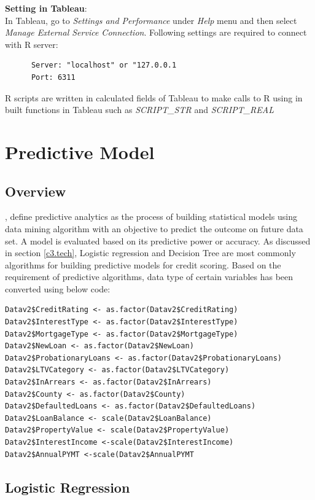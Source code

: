 \textbf{Setting in Tableau}:\\

In Tableau, go to \emph{Settings and Performance} under \emph{Help} menu and then select \emph{Manage External Service Connection}. Following settings are required to connect with R server:
      \begin{verbatim}
      Server: "localhost" or "127.0.0.1
      Port: 6311
      \end{verbatim}

R scripts are written in calculated fields of Tableau to make calls to R using in built functions in Tableau such as \emph{SCRIPT\_STR} and \emph{SCRIPT\_REAL}



\section{Predictive Model}

\subsection{Overview}
\cite{shmueli2011predictive}, define predictive analytics as the process of building statistical models using data mining algorithm with an objective to predict the outcome on future data set. A model is evaluated based on its predictive power or accuracy. As discussed in section \ref{c3.tech}, Logistic regression and Decision Tree are most commonly algorithms for building predictive models for credit scoring. Based on the requirement of predictive algorithms, data type of certain variables has been converted using below code:

\begin{verbatim}
Datav2$CreditRating <- as.factor(Datav2$CreditRating)
Datav2$InterestType <- as.factor(Datav2$InterestType)
Datav2$MortgageType <- as.factor(Datav2$MortgageType)
Datav2$NewLoan <- as.factor(Datav2$NewLoan)
Datav2$ProbationaryLoans <- as.factor(Datav2$ProbationaryLoans)
Datav2$LTVCategory <- as.factor(Datav2$LTVCategory)
Datav2$InArrears <- as.factor(Datav2$InArrears)
Datav2$County <- as.factor(Datav2$County)
Datav2$DefaultedLoans <- as.factor(Datav2$DefaultedLoans)
Datav2$LoanBalance <- scale(Datav2$LoanBalance)
Datav2$PropertyValue <- scale(Datav2$PropertyValue)
Datav2$InterestIncome <-scale(Datav2$InterestIncome)
Datav2$AnnualPYMT <-scale(Datav2$AnnualPYMT
\end{verbatim}

\subsection{Logistic Regression}

